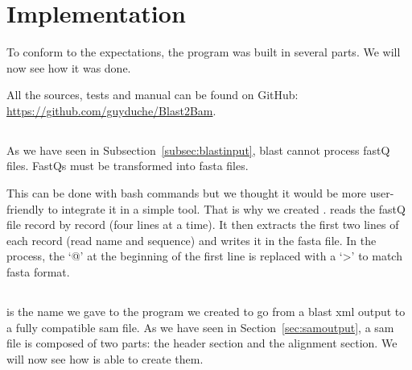 \chapter{Implementation}
To conform to the expectations, the program was built in several parts.
We will now see how it was done.

All the sources, tests and manual can be found on GitHub: \url{https://github.com/guyduche/Blast2Bam}.


\section{\fastqtofasta{}}\label{sec:fastq2fasta}
As we have seen in Subsection~\ref{subsec:blastinput}, \gls{blast} cannot process fastQ files.
FastQs must be transformed into fasta files.

This can be done with bash commands but we thought it would be more user-friendly to integrate it in a simple tool.
That is why we created \fastqtofasta{}.
\fastqtofasta{} reads the fastQ file record by record (four lines at a time).
It then extracts the first two lines of each record (read name and sequence) and writes it in the fasta file.
In the process, the `@' at the beginning of the first line is replaced with a `\textgreater' to match fasta format.


\section{\blastobam{}}
\blastobam{} is the name we gave to the program we created to go from a \gls{blast} \gls{xml} output to a fully compatible \gls{sam} file.
As we have seen in Section~\ref{sec:samoutput}, a \gls{sam} file is composed of two parts: the header section and the alignment section.
We will now see how \blastobam{} is able to create them.


